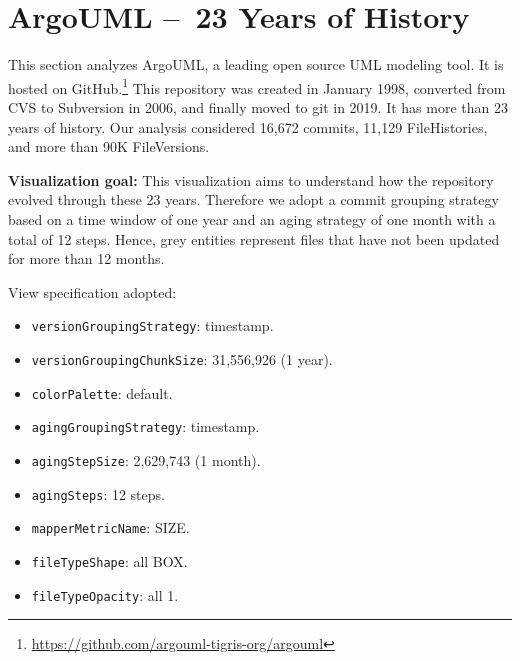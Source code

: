 \section{ArgoUML – 23 Years of History}
This section analyzes ArgoUML, a leading open source UML modeling tool. 
It is hosted on GitHub.\footnote{\url{https://github.com/argouml-tigris-org/argouml}}
This repository was created in January 1998, converted from CVS to Subversion in 2006, and finally moved to git in 2019.
It has more than 23 years of history. 
Our analysis considered 16,672 commits, 11,129 FileHistories, and more than 90K FileVersions. 

\bigbreak
\label{subsec:view4}
\textbf{Visualization goal:}
This visualization aims to understand how the repository evolved through these 23 years. Therefore we adopt a commit grouping strategy based on a time window of one year and an aging strategy of one month with a total of 12 steps. Hence, grey entities represent files that have not been updated for more than 12 months. 


View specification adopted: 
\begin{itemize}
    \item \texttt{versionGroupingStrategy}: timestamp.
    \item \texttt{versionGroupingChunkSize}: 31,556,926 (1 year). 
    \item \texttt{colorPalette}: default.
    \item \texttt{agingGroupingStrategy}: timestamp.
    \item \texttt{agingStepSize}: 2,629,743 (1 month).
    \item \texttt{agingSteps}: 12 steps.
    \item \texttt{mapperMetricName}: SIZE. 
    \item \texttt{fileTypeShape}: all BOX. 
    \item \texttt{fileTypeOpacity}: all 1. 
\end{itemize}


